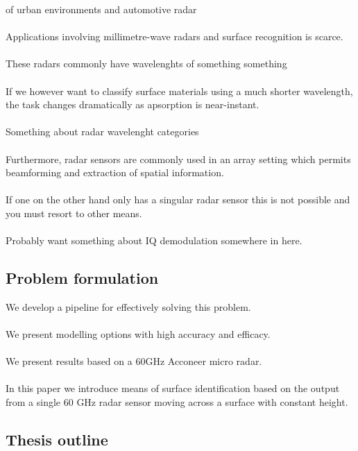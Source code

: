 \documentclass[a4paper, 12pt]{article}
\begin{document}
 of urban environments and automotive radar 
\\ \\
Applications involving millimetre-wave radars and surface recognition is scarce.  
\\ \\
These radars commonly have wavelenghts of something something
\\ \\
If we however want to classify surface materials using a much shorter wavelength, the task changes dramatically as apsorption is near-instant. 
\\ \\
Something about radar wavelenght categories
\\ \\
Furthermore, radar sensors are commonly used in an array setting which permits beamforming and extraction of spatial information. 
\\ \\
If one on the other hand only has a singular radar sensor this is not possible and you must resort to other means.
\\ \\
Probably want something about IQ demodulation somewhere in here.

\subsection{Problem formulation}

We develop a pipeline for effectively solving this problem. 
\\ \\
We present modelling options with high accuracy and efficacy. 
\\ \\ 
We present results based on a 60GHz Acconeer micro radar. 
\\ \\
In this paper we introduce means of surface identification based on the output from a single 60 GHz radar sensor moving across a surface with constant height. 

\subsection{Thesis outline}
\end{document}
